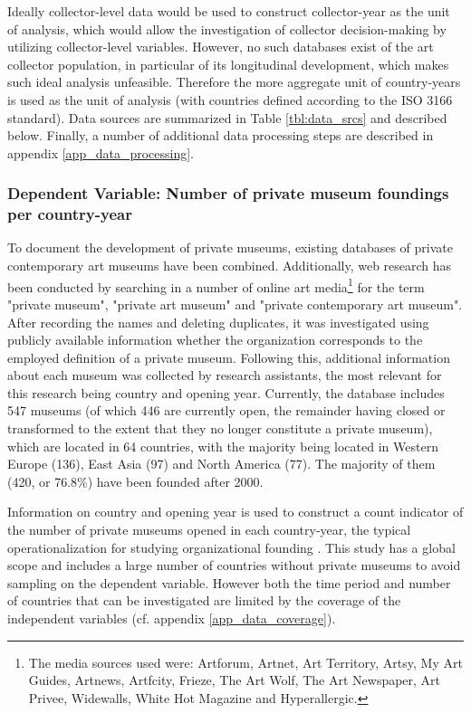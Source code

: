 \documentclass[11pt]{article}
\begin{document}
Ideally collector-level data would be used to construct collector-year as the unit of analysis, which would allow the investigation of collector decision-making by utilizing collector-level variables. 
However, no such databases exist of the art collector population, in particular of its longitudinal development, which makes such ideal analysis unfeasible. 
Therefore the more aggregate unit of country-years is used as the unit of analysis (with countries defined according to the ISO 3166 standard). 
Data sources are summarized in Table \ref{tbl:data_srcs} and described below.
Finally, a number of additional data processing steps are described in appendix \ref{app_data_processing}.


\subsubsection*{Dependent Variable: Number of private museum foundings per country-year}


To document the development of private museums, existing databases of private contemporary art museums \parencite{LarrysList_2015_report,Independent_collectors,global_private_museum_network_2020_museums,BMW_Independent_Collectors_2018_artguide,vdEerenbeemt_vdWauw_DDD_2016} have been combined.
Additionally, web research has been conducted by searching in a number of online art media\footnote{The media sources used were: Artforum, Artnet, Art Territory, Artsy, My Art Guides, Artnews, Artfcity, Frieze, The Art Wolf, The Art Newspaper, Art Privee, Widewalls, White Hot Magazine and Hyperallergic.} for the term "private museum", "private art museum" and "private contemporary art museum".
After recording the names and deleting duplicates, it was investigated using publicly available information whether the organization corresponds to the employed definition of a private museum.
Following this, additional information about each museum was collected by research assistants, the most relevant for this research being country and opening year.
Currently, the database includes 547 museums (of which 446 are currently open, the remainder having closed or transformed to the extent that they no longer constitute a private museum), which are located in 64 countries, with the majority being located in Western Europe (136), East Asia (97) and North America (77).
The majority of them (420, or 76.8\%) have been founded after 2000.


Information on country and opening year is used to construct a count indicator of the number of private museums opened in each country-year, the typical operationalization for studying organizational founding \parencite{Bogaert_etal_2014_ecological}. 
This study has a global scope and includes a large number of countries without private museums to avoid sampling on the dependent variable. 
However both the time period and number of countries that can be investigated are limited by the coverage of the independent variables (cf. appendix \ref{app_data_coverage}). 
\end{document}
